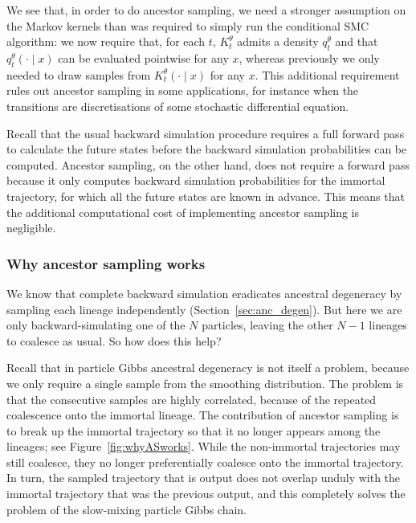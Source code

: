 We see that, in order to do ancestor sampling, we need a stronger assumption on the Markov kernels than was required to simply run the conditional SMC algorithm: we now require that, for each $t$, $K_t^\theta$ admits a density $q_t^\theta$ and that $q_t^\theta(\cdot \mid x)$ can be evaluated pointwise for any $x$, whereas previously we only needed to draw samples from $K_t^\theta(\cdot\mid x)$ for any $x$.
This additional requirement rules out ancestor sampling in some applications, for instance when the transitions are discretisations of some stochastic differential equation.

Recall that the usual backward simulation procedure requires a full forward pass to calculate the future states before the backward simulation probabilities can be computed. Ancestor sampling, on the other hand, does not require a forward pass because it only computes backward simulation probabilities for the immortal trajectory, for which all the future states are known in advance. This means that the additional computational cost of implementing ancestor sampling is negligible.




\subsubsection{Why ancestor sampling works}
We know that complete backward simulation eradicates ancestral degeneracy by sampling each lineage independently (Section~\ref{sec:anc_degen}).
But here we are only backward-simulating one of the $N$ particles, leaving the other $N-1$ lineages to coalesce as usual. So how does this help?

Recall that in particle Gibbs ancestral degeneracy is not itself a problem, because we only require a single sample from the smoothing distribution. 
The problem is that the consecutive samples are highly correlated, because of  the repeated coalescence onto the immortal lineage.
The contribution of ancestor sampling is to break up the immortal trajectory so that it no longer appears among the lineages; see Figure~\ref{fig:whyASworks}. While the non-immortal trajectories may still coalesce, they no longer preferentially coalesce onto the immortal trajectory. 
In turn, the sampled trajectory that is output does not overlap unduly with the immortal trajectory that was the previous output, and this completely solves the problem of the slow-mixing particle Gibbs chain.

